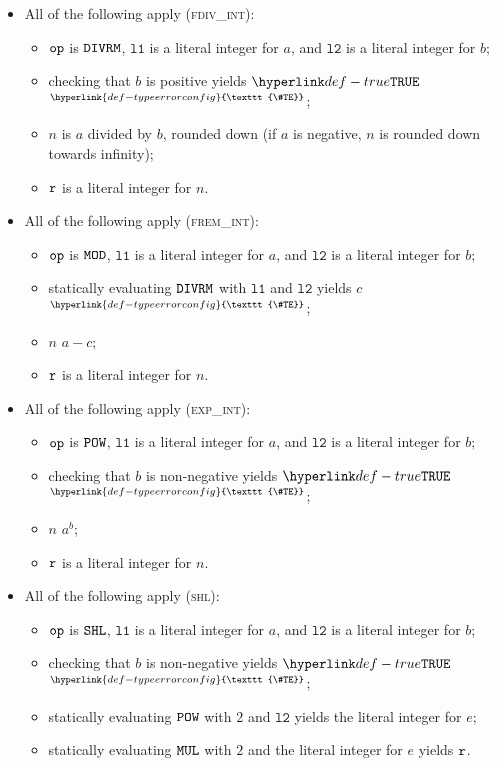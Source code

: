 \documentclass{book}
\newcommand\TypeErrorConfig[0]{\hyperlink{def-typeerrorconfig}{\texttt{\#TE}}}
\newcommand\ProseOrTypeError[0]{\hyperlink{def-proseortypeerror}{$^{\TypeErrorConfig}$}}
\newcommand\vlone[0]{\texttt{l1}}
\newcommand\vltwo[0]{\texttt{l2}}
\begin{document}
\begin{itemize}
  \item All of the following apply (\textsc{fdiv\_int}):
  \begin{itemize}
    \item $\texttt{op}$ is $\texttt{DIVRM}$, $\vlone$ is a literal integer for $a$, and $\vltwo$ is a literal integer for $b$;
    \item checking that $b$ is positive yields $\True$ \ProseOrTypeError;
    \item $n$ is $a$ divided by $b$, rounded down (if $a$ is negative, $n$ is rounded down towards infinity);
    \item $\texttt{r}$ is a literal integer for $n$.
  \end{itemize}

  \item All of the following apply (\textsc{frem\_int}):
  \begin{itemize}
    \item $\texttt{op}$ is $\texttt{MOD}$, $\vlone$ is a literal integer for $a$, and $\vltwo$ is a literal integer for $b$;
    \item statically evaluating $\texttt{DIVRM}$ with $\vlone$ and $\vltwo$ yields $c$ \ProseOrTypeError;
    \item $n$ $a-c$;
    \item $\texttt{r}$ is a literal integer for $n$.
  \end{itemize}

  \item All of the following apply (\textsc{exp\_int}):
  \begin{itemize}
    \item $\texttt{op}$ is $\texttt{POW}$, $\vlone$ is a literal integer for $a$, and $\vltwo$ is a literal integer for $b$;
    \item checking that $b$ is non-negative yields $\True$ \ProseOrTypeError;
    \item $n$ $a^b$;
    \item $\texttt{r}$ is a literal integer for $n$.
  \end{itemize}

  \item All of the following apply (\textsc{shl}):
  \begin{itemize}
    \item $\texttt{op}$ is $\texttt{SHL}$, $\vlone$ is a literal integer for $a$, and $\vltwo$ is a literal integer for $b$;
    \item checking that $b$ is non-negative yields $\True$ \ProseOrTypeError;
    \item statically evaluating $\texttt{POW}$ with $2$ and $\vltwo$ yields the literal integer for $e$;
    \item statically evaluating $\texttt{MUL}$ with $2$ and the literal integer for $e$ yields $\texttt{r}$.
  \end{itemize}


\end{itemize}
\end{document}
